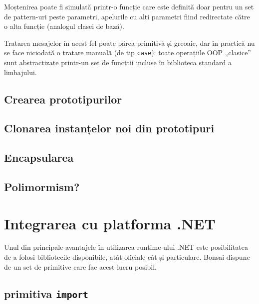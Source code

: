 \documentclass[12pt,a4paper]{memoir}
\begin{document}
Moștenirea poate fi simulată printr-o funcție care este definită doar pentru un set de pattern-uri peste parametri, apelurile cu alți parametri fiind redirectate către o alta funcție (analogul clasei de bază).

Tratarea mesajelor în acest fel poate părea primitivă și greoaie, dar în practică nu se face niciodată o tratare manuală (de tip \texttt{case}): toate operațiile OOP „clasice” sunt abstractizate printr-un set de funcțtii incluse în biblioteca standard a limbajului.

\section{Crearea prototipurilor}


\section{Clonarea instanțelor noi din prototipuri}


\section{Encapsularea}


\section{Polimormism?}


\chapter{Integrarea cu platforma .NET}

Unul din principale avantajele în utilizarea runtime-ului .NET este posibilitatea de a folosi bibliotecile disponibile, atât oficiale cât și particulare. Bonsai dispune de un set de primitive care fac acest lucru posibil.

\section{primitiva \texttt{import}}
\end{document}
